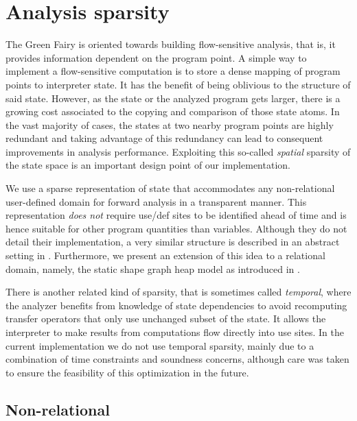 \documentclass[11pt]{article}
\begin{document}
\section*{Analysis sparsity}
The Green Fairy is oriented towards building flow-sensitive analysis, that is, it provides information dependent on the program point. 
A simple way to implement a flow-sensitive computation is to store a dense mapping of program points to interpreter state. It has the benefit of being oblivious to the structure of said state.
However, as the state or the analyzed program gets larger, there is a growing cost associated to the copying and comparison of those state atoms.
In the vast majority of cases, the states at two nearby program points are highly redundant and taking advantage of this redundancy can lead to consequent improvements in analysis performance. Exploiting this so-called \emph{spatial} sparsity of the state space is an important design point of our implementation.

We use a sparse representation of state that accommodates any non-relational user-defined domain for forward analysis in a transparent manner.
This representation \emph{does not} require use/def sites to be identified ahead of time and is hence suitable for other program quantities than variables.
Although they do not detail their implementation, a very similar structure is described in an abstract setting in \cite{sparse-nr}.
Furthermore, we present an extension of this idea to a relational domain, namely, the static shape graph heap model as introduced in \cite{ssc}.

There is another related kind of sparsity, that is sometimes called \emph{temporal}, where the analyzer benefits from knowledge of state dependencies to avoid recomputing transfer operators that only use unchanged subset of the state. It allows the interpreter to make results from computations flow directly into use sites. In the current implementation we do not use temporal sparsity, mainly due to a combination of time constraints and soundness concerns, although care was taken to ensure the feasibility of this optimization in the future.

\subsection*{Non-relational}
\end{document}
